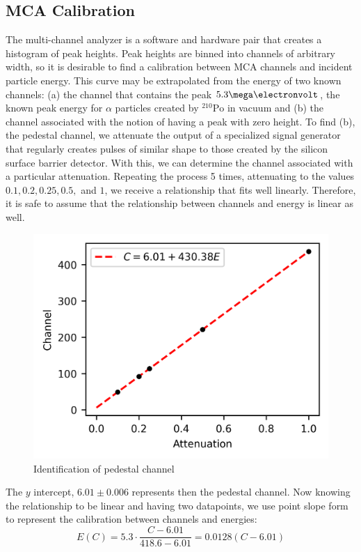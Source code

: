 \documentclass[12pt]{article}
\newcommand{\po}{{}^{210}\text{Po}}
\begin{document}
\begin{multicols}{2}
    \subsection{MCA Calibration}
    The multi-channel analyzer is a software and hardware pair that creates a histogram of peak heights. Peak heights are binned into channels of arbitrary width, so it is desirable to find a calibration between MCA channels and incident particle energy. This curve may be extrapolated from the energy of two known channels: (a) the channel that contains the peak $5.3 \mega\electronvolt$, the known peak energy for $\alpha$ particles created by $\po$ in vacuum and (b) the channel associated with the notion of having a peak with zero height. To find (b), the pedestal channel, we attenuate the output of a specialized signal generator that regularly creates pulses of similar shape to those created by the silicon surface barrier detector. With this, we can determine the channel associated with a particular attenuation. Repeating the process 5 times, attenuating to the values $0.1, 0.2, 0.25, 0.5,$ and $1$, we receive a relationship that fits well linearly. Therefore, it is safe to assume that the relationship between channels and energy is linear as well.

    \begin{figure}[H]
        \includegraphics{charts/calibration.png}
        \caption{Identification of pedestal channel}
    \end{figure}

    The $y$ intercept, $6.01\pm 0.006$ represents then the pedestal channel. Now knowing the relationship to be linear and having two datapoints, we use point slope form to represent the calibration between channels and energies:
    \begin{equation}
        E(C) = 5.3 \cdot \frac{C - 6.01}{418.6 - 6.01} = 0.0128(C - 6.01)
        \label{calibration}
    \end{equation}


\end{multicols}
\end{document}
